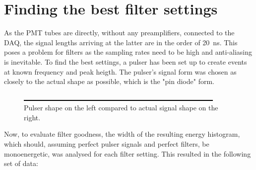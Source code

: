   \section{Finding the best filter settings}
  \label{ch:Analysis:sec:Finding the best filter settings}
  As the PMT tubes are directly, without any preamplifiers, connected to the DAQ, the signal lengths arriving at the latter are in the order of \SI{20}{\nano\second}. This poses a problem for filters as the sampling rates need to be high and anti-aliasing is inevitable. To find the best settings, a pulser has been set up to create events at known frequency and peak heigth. The pulser's signal form  was chosen as closely to the actual shape as possible, which is the "pin diode" form.
 
  \begin{figure}
	\caption{Pulser shape on the left compared to actual signal shape on the right. }
  	\includegraphics[width = 0.9\textwidth]{graphics/dummy.eps}
  \end{figure}

  
  Now, to evaluate filter goodness, the width of the resulting energy histogram, which should, assuming perfect pulser signals and perfect filters, be monoenergetic, was analysed for each filter setting. This resulted in the following set of data:
  
